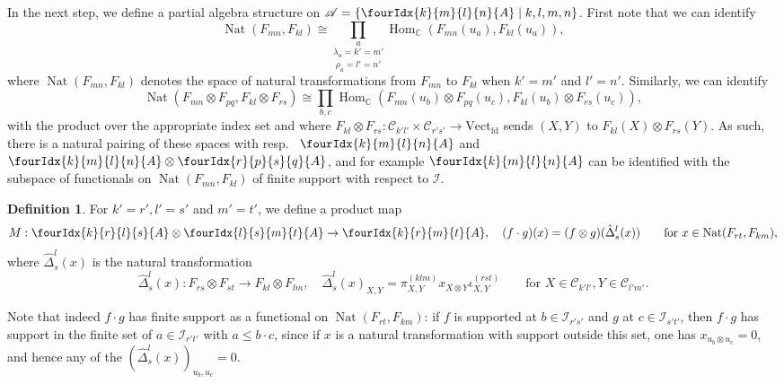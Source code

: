 \documentclass[10pt]{article}
\DeclareMathOperator{\fin}{\mathrm{fd}}
\DeclareMathOperator{\Hom}{Hom}
\DeclareMathOperator{\Nat}{\mathrm{Nat}}
\newcommand{\C}{\mathbb{C}}
\newcommand{\CatC}{\mathcal{C}}
\newcommand{\Vect}{\mathrm{Vect}}
\newcommand{\Gr}[5]{\fourIdx{#2}{#4}{#3}{#5}{#1}}%
\theoremstyle{definition}
\newtheorem{Def}[Theorem]{Definition}
\numberwithin{equation}{section}
\begin{document}
In the next step, we define a partial algebra structure on $\mathscr{A} = \{\Gr{A}{k}{l}{m}{n}\mid k,l,m,n\}$. First note that we can identify \[\Nat(F_{mn},F_{kl}) \cong \underset{\rho_a=l'=n'}{\underset{\lambda_a=k'=m'}{\prod_a}} \Hom_{\C}(F_{mn}(u_a),F_{kl}(u_a)),\] where $\Nat(F_{mn},F_{kl})$ denotes the space of natural transformations from $F_{mn}$ to $F_{kl}$ when $k'=m'$ and $l'=n'$. Similarly, we can identify \[\Nat(F_{mn}\otimes F_{pq},F_{kl}\otimes F_{rs}) \cong  \prod_{b,c} \Hom_{\C}(F_{mn}(u_b)\otimes F_{pq}(u_c) ,F_{kl}(u_b)\otimes F_{rs}(u_c)),\] with the product over the appropriate index set and where $F_{kl}\otimes F_{rs}:\CatC_{k'l'}\times \CatC_{r's'}\rightarrow \Vect_{\fin}$ sends $(X,Y)$ to $F_{kl}(X)\otimes F_{rs}(Y).$ As such, there is a natural pairing of these spaces with resp.~ $\Gr{A}{k}{l}{m}{n}$ and $\Gr{A}{k}{l}{m}{n}\otimes \Gr{A}{r}{s}{p}{q}$, and for example $\Gr{A}{k}{l}{m}{n}$ can be identified with the subspace of functionals on $\Nat(F_{mn},F_{kl})$ of finite support with respect to $\mathcal{I}$. 

\begin{Def} For $k'=r', l'=s'$ and $m'=t'$, we define a product map \[M:\Gr{A}{k}{l}{r}{s} \otimes \Gr{A}{l}{m}{s}{t}\rightarrow  \Gr{A}{k}{m}{r}{t},\quad (f\cdot g)(x) = (f\otimes g)( \hat{\Delta}^{l}_{s}(x)) \qquad  \textrm{for }x \in \Nat(F_{rt},F_{km}),\] where $\hat{\Delta}^l_s(x)$ is the natural transformation \[\hat{\Delta}^l_s(x):  F_{rs}\otimes F_{st}\rightarrow F_{kl}\otimes F_{lm},\quad \hat{\Delta}^l_s(x)_{X,Y} = \pi^{(klm)}_{X,Y}x_{X\otimes Y} \iota^{(rst)}_{X,Y} \qquad \textrm{for }X\in \CatC_{k'l'},Y\in \CatC_{l'm'}.\]
\end{Def}

Note that indeed $f\cdot g$ has finite support as a functional on $\Nat(F_{rt},F_{km})$: if $f$ is supported at $b\in \mathcal{I}_{r's'}$ and $g$ at $c\in \mathcal{I}_{s't'}$, then $f\cdot g$ has support in the finite set of $a\in \mathcal{I}_{r't'}$ with $a\leq b\cdot c$, since if $x$ is a natural transformation with support outside this set, one has $x_{u_b\otimes u_c}=0$, and hence any of the $\left(\hat{\Delta}^l_s(x)\right)_{u_b,u_c} =0$.
\end{document}
